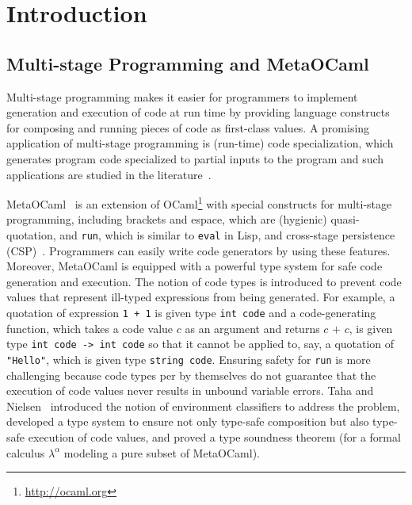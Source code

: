 
\section{Introduction}
\label{sec:intro}

\subsection{Multi-stage Programming and MetaOCaml}

Multi-stage programming makes it easier for programmers to implement
generation and execution of code at run time by providing language
constructs for composing and running pieces of code as first-class
values.  A promising application of multi-stage programming is
(run-time) code specialization, which generates program code
specialized to partial inputs to the program and such applications are
studied in the literature~\cite{8384206,mainland2012metahaskell,taha2007gentle}.

MetaOCaml~\cite{calcagno2003implementing,oleg2014} is an extension of
OCaml\footnote{\url{http://ocaml.org}} with special constructs for
multi-stage programming, including brackets and espace, which are
(hygienic) quasi-quotation, and \texttt{run}, which is similar to
\texttt{eval} in Lisp, and cross-stage persistence
(CSP)~\cite{MetaML}.  Programmers can easily write code generators by
using these features.  Moreover, MetaOCaml is equipped with a powerful
type system for safe code generation and execution.  The notion of
code types is introduced to prevent code values that represent
ill-typed expressions from being generated.  For example, a quotation
of expression \texttt{1 + 1} is given type \texttt{int code}
and a code-generating function, which takes a code value \(c\) as an
argument and returns \(c \texttt{ + } c\), is given type \texttt{int
  code -> int code} so that it cannot be applied to, say, a quotation
of \texttt{"Hello"}, which is given type \texttt{string
  code}.  Ensuring safety for \verb|run| is more challenging because
code types per by themselves do not guarantee that the execution of code values never
results in unbound variable errors.  Taha and
Nielsen~\cite{taha2003environment} introduced the notion of
environment classifiers to address the problem, developed a type
system to ensure not only type-safe composition but also type-safe
execution of code values, and proved a type soundness theorem (for a formal calculus \(\lambda^\alpha\) modeling a pure subset of MetaOCaml).


